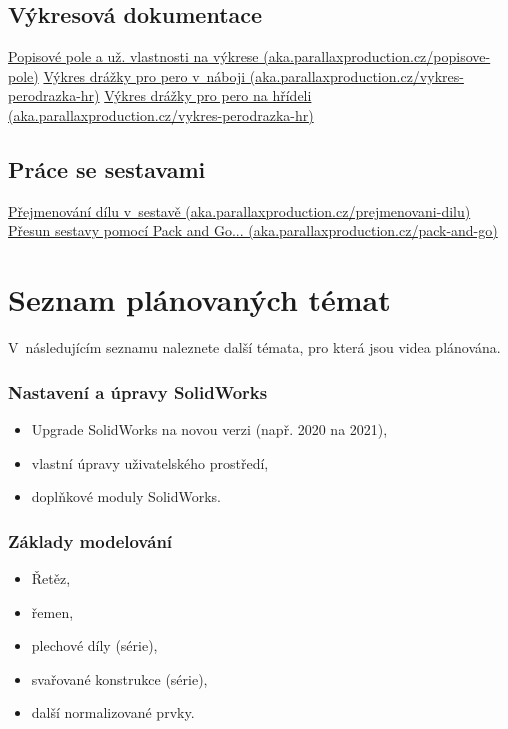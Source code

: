\section{Výkresová dokumentace} \label{videa-vykresy}
\href{https://aka.parallaxproduction.cz/popisove-pole}{Popisové pole a už. vlastnosti na výkrese (aka.parallaxproduction.cz/popisove-pole)} \newline
\href{https://aka.parallaxproduction.cz/vykres-perodrazka-na}{Výkres drážky pro pero v~náboji (aka.parallaxproduction.cz/vykres-perodrazka-hr)} \newline
\href{https://aka.parallaxproduction.cz/vykres-perodrazka-hr}{Výkres drážky pro pero na hřídeli (aka.parallaxproduction.cz/vykres-perodrazka-hr)} \newline

\section{Práce se sestavami} \label{videa-sestavy}
\href{https://aka.parallaxproduction.cz/prejmenovani-dilu}{Přejmenování dílu v~sestavě (aka.parallaxproduction.cz/prejmenovani-dilu)} \newline
\href{https://aka.parallaxproduction.cz/pack-and-go}{Přesun sestavy pomocí Pack and Go... (aka.parallaxproduction.cz/pack-and-go)} \newline

\chapter{Seznam plánovaných témat} \label{planned-videos}
V~následujícím seznamu naleznete další témata, pro která jsou videa plánována.

\subsection*{Nastavení a úpravy SolidWorks}
\begin{itemize}
    \setlength\itemsep{0.05em}
    \item Upgrade SolidWorks na novou verzi (např. 2020 na 2021),
    \item vlastní úpravy uživatelského prostředí,
    \item doplňkové moduly SolidWorks.
\end{itemize}

\subsection*{Základy modelování}
\begin{itemize}
    \setlength\itemsep{0.05em}
    \item Řetěz,
    \item řemen,
    \item plechové díly (série),
    \item svařované konstrukce (série),
    \item další normalizované prvky.
\end{itemize}

